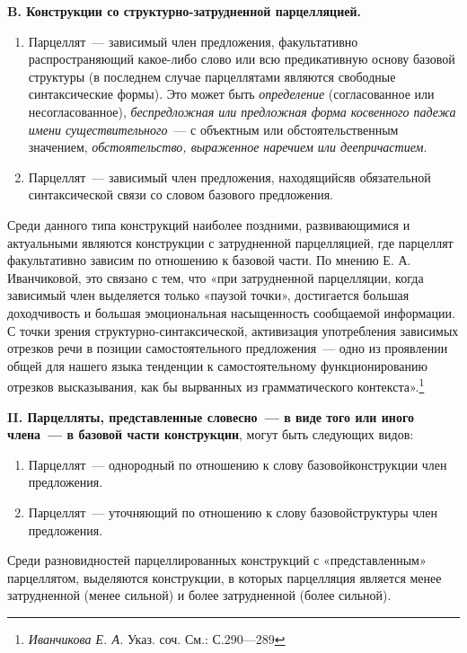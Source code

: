 \documentclass{kursa4}
\begin{document}
{      {\centering\textbf{B. Конструкции со структурно-затрудненной парцелляцией.}}
      \begin{enumerate}
        \item {Парцеллят~--- зависимый член предложения,
        факультативно распространяющий какое-либо слово или всю предикативную
        основу базовой структуры (в последнем случае парцеллятами являются
        свободные синтаксические формы). Это может быть
        }\textit{определение}
        (согласованное или несогласованное), \textit{беспредложная или предложная форма
        косвенного падежа имени существительного}~--- с
        объектным или обстоятельственным значением,
        \textit{обстоятельство, выраженное наречием или
        деепричастием}.
        \item {Парцеллят~--- зависимый член предложения,
        находящийся}в обязательной
        синтаксической связи со словом базового предложения.
      \end{enumerate}

      Среди данного типа конструкций наиболее поздними,
      развивающимися и актуальными являются конструкции с затрудненной
      парцелляцией, где парцеллят факультативно зависим по отношению к
      базовой части. По мнению Е. А. Иванчиковой, это связано с тем, что «при
      затрудненной парцелляции, когда зависимый член выделяется только «паузой точки»,
      достигается большая доходчивость и большая эмоциональная насыщенность
      сообщаемой информации. С точки зрения структурно-синтаксической,
      активизация употребления зависимых отрезков речи в позиции
      самостоятельного предложения~--- одно из проявлении общей для нашего
      языка тенденции к самостоятельному функционированию отрезков
      высказывания, как бы вырванных из грамматического
      контекста».\footnote{\textit{ Иванчикова Е. А.
      }{Указ. соч. См.: С.290—289}}

      \textbf{II. Парцелляты, представленные словесно~---
      в виде того или иного члена~--- в базовой части
      конструкции}, могут быть следующих видов:
      \begin{enumerate}
        \item {Парцеллят~--- однородный по отношению к слову
        базовой}{конструкции член
        предложения.}
        \item {Парцеллят~--- уточняющий по отношению к слову
        базовой}{структуры член
        предложения.}
      \end{enumerate}

      Среди разновидностей парцеллированных конструкций
      с «представленным» парцеллятом, выделяются конструкции, в которых
      парцелляция является менее затрудненной (менее сильной) и более
      затрудненной (более сильной).

}
\end{document}
